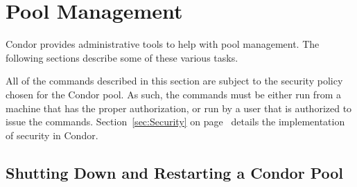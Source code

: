 \section{\label{sec:Pool-Management}Pool Management}

Condor provides administrative tools to help with
pool management.
The following sections describe some of these various tasks.

All of the commands described in this section are subject to the
security policy chosen for the Condor pool.
As such, the commands must be either run from a
machine that has the proper authorization, 
or run by a user that is authorized to issue the commands.
Section~\ref{sec:Security} on
page~\pageref{sec:Security} details the implementation of 
security in Condor.

\subsection{\label{sec:Pool-Shutdown-and-Restart}
Shutting Down and Restarting a Condor Pool}

\Todo

